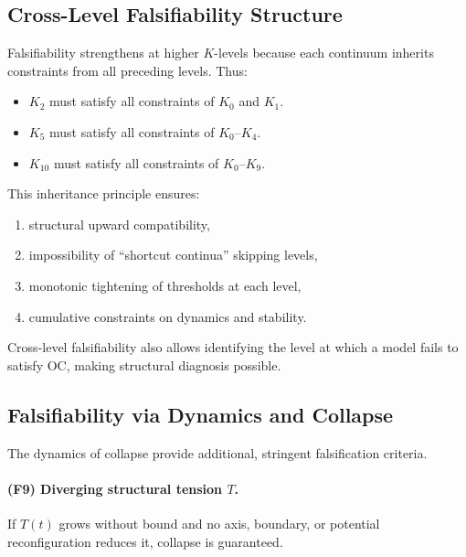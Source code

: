 \subsection{Cross-Level Falsifiability Structure}

Falsifiability strengthens at higher $K$-levels because each continuum
inherits constraints from all preceding levels.
Thus:

\begin{itemize}
    \item $K_2$ must satisfy all constraints of $K_0$ and $K_1$.
    \item $K_5$ must satisfy all constraints of $K_0$–$K_4$.
    \item $K_{10}$ must satisfy all constraints of $K_0$–$K_9$.
\end{itemize}

This inheritance principle ensures:

\begin{enumerate}
    \item structural upward compatibility,
    \item impossibility of “shortcut continua” skipping levels,
    \item monotonic tightening of thresholds at each level,
    \item cumulative constraints on dynamics and stability.
\end{enumerate}

Cross-level falsifiability also allows identifying the level at which a
model fails to satisfy OC, making structural diagnosis possible.



\subsection{Falsifiability via Dynamics and Collapse}

The dynamics of collapse provide additional, stringent falsification
criteria.

\paragraph{(F9) Diverging structural tension \texorpdfstring{$T$}{T}.}  
If $T(t)$ grows without bound and no axis, boundary, or potential
reconfiguration reduces it, collapse is guaranteed.

